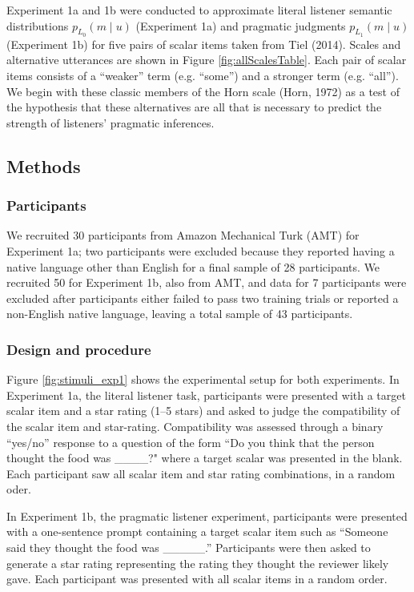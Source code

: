 \documentclass[10pt, letterpaper]{article}
\begin{document}
Experiment 1a and 1b were conducted to approximate literal listener
semantic distributions \(p_{L_0}(m \mid u)\) (Experiment 1a) and
pragmatic judgments \(p_{L_1}(m \mid u)\) (Experiment 1b) for five pairs
of scalar items taken from Tiel (2014). Scales and alternative
utterances are shown in Figure \ref{fig:allScalesTable}. Each pair of
scalar items consists of a ``weaker'' term (e.g. ``some'') and a
stronger term (e.g. ``all''). We begin with these classic members of the
Horn scale (Horn, 1972) as a test of the hypothesis that these
alternatives are all that is necessary to predict the strength of
listeners' pragmatic inferences.

\subsection{Methods}\label{methods}

\subsubsection{Participants}\label{participants}

We recruited 30 participants from Amazon Mechanical Turk (AMT) for
Experiment 1a; two participants were excluded because they reported
having a native language other than English for a final sample of 28
participants. We recruited 50 for Experiment 1b, also from AMT, and data
for 7 participants were excluded after participants either failed to
pass two training trials or reported a non-English native language,
leaving a total sample of 43 participants.

\subsubsection{Design and procedure}\label{design-and-procedure}

Figure \ref{fig:stimuli_exp1} shows the experimental setup for both
experiments. In Experiment 1a, the literal listener task, participants
were presented with a target scalar item and a star rating (1--5 stars)
and asked to judge the compatibility of the scalar item and star-rating.
Compatibility was assessed through a binary ``yes/no'' response to a
question of the form ``Do you think that the person thought the food was
\_\_\_\_?" where a target scalar was presented in the blank. Each
participant saw all scalar item and star rating combinations, in a
random oder.

In Experiment 1b, the pragmatic listener experiment, participants were
presented with a one-sentence prompt containing a target scalar item
such as ``Someone said they thought the food was \_\_\_\_\_.''
Participants were then asked to generate a star rating representing the
rating they thought the reviewer likely gave. Each participant was
presented with all scalar items in a random order.
\end{document}
